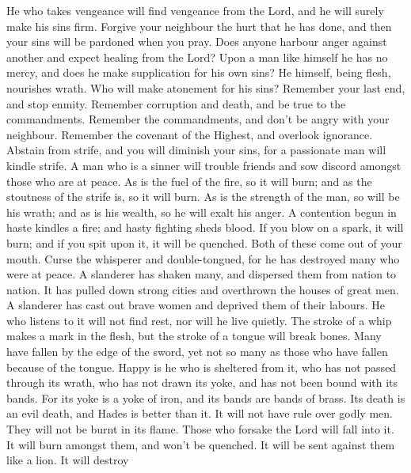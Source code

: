  He who takes vengeance will find vengeance from the Lord,
and he will surely make his sins firm.  Forgive your
neighbour the hurt that he has done, and then your sins will be pardoned
when you pray.  Does anyone harbour anger against another
and expect healing from the Lord?  Upon a man like himself
he has no mercy, and does he make supplication for his own sins?
 He himself, being flesh, nourishes wrath. Who will make
atonement for his sins?  Remember your last end, and stop
enmity. Remember corruption and death, and be true to the commandments.
 Remember the commandments, and don't be angry with your
neighbour. Remember the covenant of the Highest, and overlook ignorance.
 Abstain from strife, and you will diminish your sins, for a
passionate man will kindle strife.  A man who is a sinner
will trouble friends and sow discord amongst those who are at peace.
 As is the fuel of the fire, so it will burn; and as the
stoutness of the strife is, so it will burn. As is the strength of the
man, so will be his wrath; and as is his wealth, so he will exalt his
anger.  A contention begun in haste kindles a fire; and
hasty fighting sheds blood.  If you blow on a spark, it
will burn; and if you spit upon it, it will be quenched. Both of these
come out of your mouth.  Curse the whisperer and
double-tongued, for he has destroyed many who were at peace.
 A slanderer has shaken many, and dispersed them from
nation to nation. It has pulled down strong cities and overthrown the
houses of great men.  A slanderer has cast out brave women
and deprived them of their labours.  He who listens to it
will not find rest, nor will he live quietly.  The stroke
of a whip makes a mark in the flesh, but the stroke of a tongue will
break bones.  Many have fallen by the edge of the sword,
yet not so many as those who have fallen because of the tongue.
 Happy is he who is sheltered from it, who has not passed
through its wrath, who has not drawn its yoke, and has not been bound
with its bands.  For its yoke is a yoke of iron, and its
bands are bands of brass.  Its death is an evil death, and
Hades is better than it.  It will not have rule over godly
men. They will not be burnt in its flame.  Those who
forsake the Lord will fall into it. It will burn amongst them, and won't
be quenched. It will be sent against them like a lion. It will destroy
